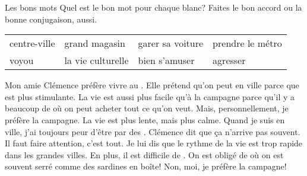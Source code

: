 \begin{frame}{Les bons mots}
  \small
  Quel est le bon mot pour chaque blanc?
  Faites le bon accord ou la bonne conjugaison, aussi.\\
  \begin{center}
    \begin{tabular}{| l l l l |}
      \hline
      centre-ville & grand magasin     & garer sa voiture & prendre le métro \\
      voyou        & la vie culturelle & bien s'amuser    & agresser \\
      \hline
    \end{tabular}
  \end{center}
  Mon amie Clémence préfère vivre au \underline{}.
  Elle prétend qu'on peut \underline{} en ville parce que \underline{} est plus stimulante.
  La vie est aussi plus facile qu'à la campagne parce qu'il y a beaucoup de \underline{} où on peut acheter tout ce qu'on veut.
  Mais, personnellement, je préfère la campagne.
  La vie est plus lente, mais plus calme.
  Quand je suis en ville, j'ai toujours peur d'être \underline{} par des \underline{}.
  Clémence dit que ça n'arrive pas souvent.
  Il faut faire attention, c'est tout.
  Je lui dis que le rythme de la vie est trop rapide dans les grandes villes.
  En plus, il est difficile de \underline{}.
  On est obligé de \underline{} où on est souvent serré comme des sardines en boîte!
  Non, moi, je préfère la campagne!
\end{frame}